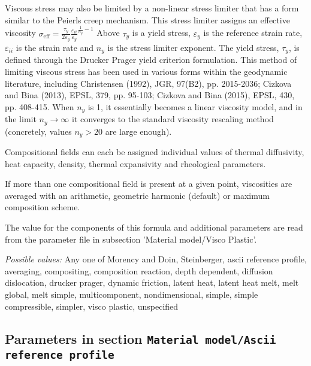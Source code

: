 \begin{itemize}
Viscous stress may also be limited by a non-linear stress limiter that has a form similar to the Peierls creep mechanism. This stress limiter assigns an effective viscosity $\sigma_\text{eff} = \frac{\tau_y}{2\varepsilon_y} {\frac{\varepsilon_{ii}}{\varepsilon_y}}^{\frac{1}{n_y}-1}$ Above $\tau_y$ is a yield stress, $\varepsilon_y$ is the reference strain rate, $\varepsilon_{ii}$ is the strain rate and $n_y$ is the stress limiter exponent.  The yield stress, $\tau_y$, is defined through the Drucker Prager yield criterion formulation. This method of limiting viscous stress has been used in various forms within the geodynamic literature, including Christensen (1992), JGR, 97(B2), pp. 2015-2036; Cizkova and Bina (2013), EPSL, 379, pp. 95-103; Cizkova and Bina (2015), EPSL, 430, pp. 408-415. When $n_y$ is 1, it essentially becomes a linear viscosity model, and in the limit $n_y\rightarrow \infty$ it converges to the standard viscosity rescaling method (concretely, values $n_y>20$ are large enough).

 Compositional fields can each be assigned individual values of thermal diffusivity, heat capacity, density, thermal expansivity and rheological parameters. 

 If more than one compositional field is present at a given point, viscosities are averaged with an arithmetic, geometric harmonic (default) or maximum composition scheme. 

 The value for the components of this formula and additional parameters are read from the parameter file in subsection  'Material model/Visco Plastic'.


{\it Possible values:} Any one of Morency and Doin, Steinberger, ascii reference profile, averaging, compositing, composition reaction, depth dependent, diffusion dislocation, drucker prager, dynamic friction, latent heat, latent heat melt, melt global, melt simple, multicomponent, nondimensional, simple, simple compressible, simpler, visco plastic, unspecified
\end{itemize}



\subsection{Parameters in section \tt Material model/Ascii reference profile}
\label{parameters:Material_20model/Ascii_20reference_20profile}

